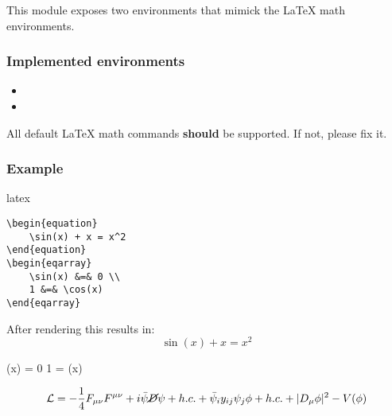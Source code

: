 \begin{paragraph}
    This module exposes two environments that mimick the LaTeX math environments.
\end{paragraph}

\subsubsection{Implemented environments}
\begin{itemize}
    \item{}
    \item{}
\end{itemize}

All default LaTeX math commands \textbf{should} be supported. If not, please fix it.

\subsubsection{Example}
\begin{code}{latex}\begin{verbatim}\begin{equation}
    \sin(x) + x = x^2
\end{equation}
\begin{eqarray}
    \sin(x) &=& 0 \\
    1 &=& \cos(x)
\end{eqarray}\end{verbatim}\end{code}

After rendering this results in:\\
\begin{equation}
    \sin(x) + x = x^2
\end{equation}
\begin{eqarray}
    \sin(x) = 0
    1 = \cos(x)
\end{eqarray}
\begin{equation}
\mathcal{L} = - \frac{1}{4} F_{\mu \nu} F^{\mu \nu} 
    + i \bar{\psi} \cancel{D} \psi + h.c. 
    + \bar{\psi}_i y_{ij} \psi_j \phi + h.c.
    + |D_\mu \phi|^2 - V(\phi)
\end{equation}
